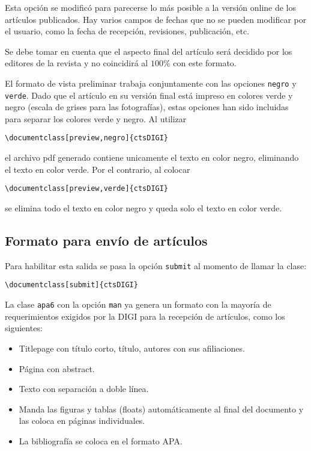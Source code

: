 \documentclass{article}
\begin{document}
Esta opción se modificó para parecerse lo más posible a la versión online de los artículos publicados. Hay varios campos de fechas que no se pueden modificar por el usuario, como la fecha de recepción, revisiones, publicación, etc.

Se debe tomar en cuenta que el aspecto final del artículo será decidido por los editores de la revista y no coincidirá al $100\%$ con este formato.

El formato de vista preliminar trabaja conjuntamente con las opciones {\tt negro} y {\tt verde}. Dado que el artículo en su versión final está impreso en colores verde y negro (escala de grises para las fotografías), estas opciones han sido incluidas para separar los colores verde y negro. Al utilizar
\begin{verbatim}
\documentclass[preview,negro]{ctsDIGI}
\end{verbatim}
el archivo pdf generado contiene unicamente el texto en color negro, eliminando el texto en color verde. Por el contrario, al colocar
\begin{verbatim}
\documentclass[preview,verde]{ctsDIGI}
\end{verbatim}
se elimina todo el texto en color negro y queda solo el texto en color verde. 

\subsection{Formato para envío de artículos}
Para habilitar esta salida se pasa la opción \texttt{submit} al momento de llamar la clase:
\begin{verbatim}
\documentclass[submit]{ctsDIGI}
\end{verbatim}

La clase \texttt{apa6} con la opción \texttt{man} ya genera un formato con la mayoría de requerimientos exigidos por la DIGI para la recepción de artículos, como los siguientes:
\begin{itemize}
\item Titlepage con título corto, título, autores con sus afiliaciones.
\item Página con abstract.
\item Texto con separación a doble línea.
\item Manda las figuras y tablas (floats) automáticamente al final del documento y las coloca en páginas individuales.
\item La bibliografía se coloca en el formato APA.
\end{itemize}
\end{document}
